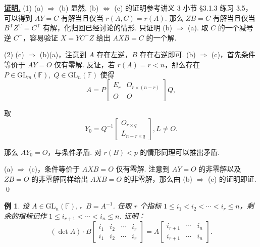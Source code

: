 \documentclass[10pt,openany]{article}
\theoremstyle{thmstyle} %
\theoremstyle{defstyle} %
\theoremstyle{prostyle} %
\theoremstyle{exastyle}
\newtheorem{example}[theorem]{例}
\theoremstyle{remstyle}
\renewenvironment{proof}[1][证明]{\par\underline{\textbf{#1.}} \;\fangsong}{\qed\par}
\newcommand{\T}{^{\text{T}}}
\newcommand{\gfn}{\text{GL}_n(\mathbb{F})}
\newcommand{\gfm}{\text{GL}_m(\mathbb{F})}
\begin{document}
\begin{proof}
	(1) (a) \( \Rightarrow \) (b) 显然. (b) \( \Leftrightarrow \) (c) 的证明参考讲义 3 小节 \S 3.1.3 练习 3.5，可以得到 \( AY=C \) 有解当且仅当 \( r(A,C)=r(A) \). 那么 \( ZB=C \) 有解当且仅当 \( B\T Z\T= C\T \) 有解，化归回已经讨论的情形. 只证明 (b) \( \Rightarrow \) (a). 取 \( C \) 的一个减号逆 \( C^{-} \)，容易验证 \( X=YC^{-}Z \) 给出 \( AXB=C \) 的一个解.
	
	(2) (c) \( \Rightarrow \) (b)(a)，注意到 \( A \) 存在左逆，\( B \) 存在右逆即可. (b) \( \Rightarrow \) (c)，首先条件等价于 \( AY=O \) 仅有零解. 反证，若 \( r(A)=r<n \)，那么存在 \( P \in \gfm, \; Q \in \gfn \) 使得
	\[ A=P\begin{bmatrix}
		E_r & O_{r \times (n-r)} \\
		O & O
	\end{bmatrix}Q, \]
	
	取
	\[ Y_0=Q^{-1}\begin{bmatrix}
		O_{r \times q} \\
		L_{n-r \times q}
	\end{bmatrix}, L \neq O. \]
	
	那么 \( AY_0=O \)，与条件矛盾. 对 \( r(B)<p \) 的情形同理可以推出矛盾.
	
	(a) \( \Rightarrow \) (c)，条件等价于 \( AXB=O \) 仅有零解. 注意到 \( AY=O \) 的非零解以及 \( ZB=O \) 的非零解同样给出 \( AXB=O \) 的非零解，那么由 (b) \( \Rightarrow \) (c) 的证明即证.
\end{proof}


\begin{example}
	设 \( A \in \gfn, \)，\( B=A^{-1} \). 任取 \( r \) 个指标 \( 1 \leq i_1<i_2<\cdots<i_r \leq n \)，剩余的指标记作 \( 1 \leq i_{r+1}<\cdots<i_{n} \leq n \). 证明：
	\[ (\det A) \cdot B \begin{bmatrix}
		i_1 & i_2 & \cdots & i_r \\
		i_1 & i_2 & \cdots & i_r
	\end{bmatrix}= A \begin{bmatrix}
	i_{r+1}  & \cdots & i_n \\
	i_{r+1}  & \cdots & i_n
	\end{bmatrix}. \]
\end{example}
\end{document}
